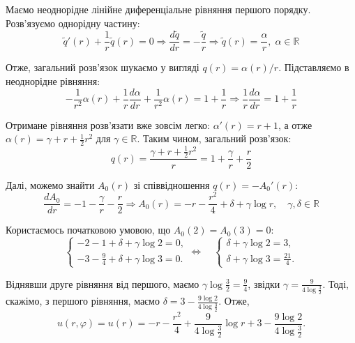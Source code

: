 \documentclass{hw_template}
\begin{document}
Маємо неоднорідне лінійне диференціальне рівняння першого порядку. Розв'язуємо однорідну частину:
\begin{equation*}
    \widetilde{q}'(r) + \frac{1}{r}\widetilde{q}(r) = 0 \Rightarrow \frac{d\widetilde{q}}{dr} = -\frac{\widetilde{q}}{r} \Rightarrow \widetilde{q}(r) = \frac{\alpha}{r}, \; \alpha \in \mathbb{R}
\end{equation*}

Отже, загальний розв'язок шукаємо у вигляді $q(r) = \alpha(r)/r$. Підставляємо в неоднорідне рівняння:
\begin{equation*}
    -\frac{1}{r^2}\alpha(r) + \frac{1}{r}\frac{d\alpha}{dr} + \frac{1}{r^2}\alpha(r) = 1 + \frac{1}{r} \Rightarrow \frac{1}{r}\frac{d\alpha}{dr} = 1+\frac{1}{r}
\end{equation*}

Отримане рівняння розв'язати вже зовсім легко: $\alpha'(r) = r+1$, а отже $\alpha(r) = \gamma+r+\frac{1}{2}r^2$ для $\gamma \in \mathbb{R}$. Таким чином, загальний розв'язок:
\begin{equation*}
    q(r) = \frac{\gamma+r+\frac{1}{2}r^2}{r} = 1 + \frac{\gamma}{r} + \frac{r}{2}
\end{equation*}

Далі, можемо знайти $A_0(r)$ зі співвідношення $q(r) = -A_0'(r)$:
\begin{equation*}
    \frac{dA_0}{dr} = -1 - \frac{\gamma}{r} - \frac{r}{2} \Rightarrow A_0(r) = -r - \frac{r^2}{4} + \delta + \gamma\log r, \quad \gamma, \delta \in \mathbb{R}
\end{equation*}

Користаємось початковою умовою, що $A_0(2) = A_0(3) = 0$:
\begin{equation*}
    \begin{cases}
        -2 - 1 + \delta + \gamma \log 2 = 0, \\
        -3 - \frac{9}{4} + \delta + \gamma \log 3 = 0.
    \end{cases} \iff \quad \begin{cases}
        \delta + \gamma \log 2 = 3, \\
        \delta + \gamma \log 3 = \frac{21}{4}.
    \end{cases}
\end{equation*}

Віднявши друге рівняння від першого, маємо $\gamma \log \frac{3}{2} =
\frac{9}{4}$, звідки $\gamma = \frac{9}{4\log \frac{3}{2}}$. Тоді, скажімо, з
першого рівняння, маємо $\delta = 3 - \frac{9 \log 2}{4\log \frac{3}{2}}$. Отже,
\begin{equation*}
    u(r,\varphi) = u(r) = -r - \frac{r^2}{4} + \frac{9}{4\log \frac{3}{2}}\log r + 3 - \frac{9 \log 2}{4\log \frac{3}{2}}.
\end{equation*}
\end{document}
